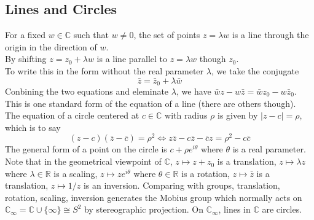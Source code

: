 \subsection{Lines and Circles}
For a fixed $w\in\mathbb C$ such that $w\neq 0$, the set of points $z=\lambda w$ is a line through the origin in the direction of $w$.\\
By shifting $z=z_0+\lambda w$ is a line parallel to $z=\lambda w$ though $z_0$.\\
To write this in the form without the real parameter $\lambda$, we take the conjugate
$$\bar z=\bar z_0+\lambda\bar w$$
Conbining the two equations and eleminate $\lambda$, we have $\bar wz-w\bar z=\bar wz_0-w\bar z_0$.
This is one standard form of the equation of a line (there are others though).\\
The equation of a circle centered at $c\in\mathbb C$ with radius $\rho$ is given by $|z-c|=\rho$, which is to say
$$(z-c)(\bar z-\bar c)=\rho^2\iff z\bar z-c\bar z-\bar cz=\rho^2-c\bar c$$
The general form of a point on the circle is $c+\rho e^{i\theta}$ where $\theta$ is a real parameter.\\
Note that in the geometrical viewpoint of $\mathbb C$, $z\mapsto z+z_0$ is a translation, $z\mapsto\lambda z$ where $\lambda\in\mathbb R$ is a scaling, $z\mapsto ze^{i\theta}$ where $\theta\in\mathbb R$ is a rotation, $z\mapsto\bar z$ is a translation, $z\mapsto 1/z$ is an inversion.
Comparing with groups, translation, rotation, scaling, inversion generates the Mobius group which normally acts on $\mathbb C_\infty=\mathbb C\cup\{\infty\}\cong S^2$ by stereographic projection.
On $\mathbb C_\infty$, lines in $\mathbb C$ are circles.